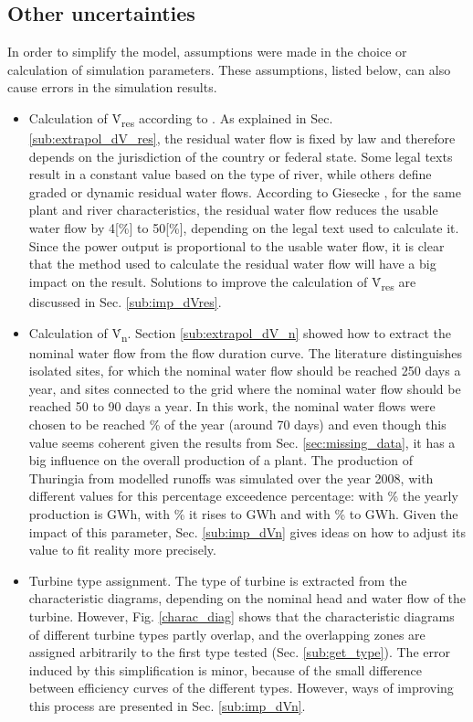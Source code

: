 \subsection{Other uncertainties}
\label{sub:limits_others}

In order to simplify the model, assumptions were made in the choice or calculation of simulation parameters. These assumptions, listed below, can also cause errors in the simulation results. 
\begin{itemize}
 \item Calculation of \.V\textsubscript{res} according to \cite{pacer}. As explained in Sec. \ref{sub:extrapol_dV_res}, the residual water flow is fixed by law and therefore depends on the jurisdiction of the country or federal state. Some legal texts result in a constant value based on the type of river, while others define graded or dynamic residual water flows. According to Giesecke \cite{gies_qrest}, for the same plant and river characteristics, the residual water flow reduces the usable water flow by \unit{4}[\%] to \unit{50}[\%], depending on the legal text used to calculate it. Since the power output is proportional to the usable water flow, it is clear that the method used to calculate the residual water flow will have a big impact on the result. Solutions to improve the calculation of \.V\textsubscript{res} are discussed in Sec. \ref{sub:imp_dVres}.
 \item Calculation of \.V\textsubscript{n}. Section \ref{sub:extrapol_dV_n} showed how to extract the nominal water flow from the flow duration curve. The literature distinguishes isolated sites, for which the nominal water flow should be reached 250 days a year, and sites connected to the grid where the nominal water flow should be reached 50 to 90 days a year. In this work, the nominal water flows were chosen to be reached \unit[20]{\%} of the year (around 70 days) and even though this value seems coherent given the results from Sec. \ref{sec:missing_data}, it has a big influence on the overall production of a plant. The production of Thuringia from modelled runoffs was simulated over the year 2008, with different values for this percentage exceedence percentage:  with \unit[20]{\%} the yearly production is \unit[187]{GWh}, with \unit[30]{\%} it rises to \unit[210]{GWh} and with \unit[40]{\%} to \unit[223]{GWh}. Given the impact of this parameter, Sec. \ref{sub:imp_dVn} gives ideas on how to adjust its value to fit reality more precisely.
 \item Turbine type assignment. The type of turbine is extracted from the characteristic diagrams, depending on the nominal head and water flow of the turbine. However, Fig. \ref{charac_diag} shows that the characteristic diagrams of different turbine types partly overlap, and the overlapping zones are assigned arbitrarily to the first type tested (Sec. \ref{sub:get_type}). The error induced by this simplification is minor, because of the small difference between efficiency curves of the different types. However, ways of improving this process are presented in Sec. \ref{sub:imp_dVn}.

\end{itemize}
